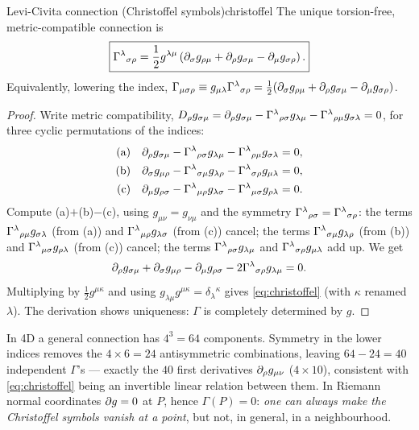 \begin{theorem}{Levi-Civita connection (Christoffel symbols)}{christoffel}
The unique torsion-free, metric-compatible connection is
\begin{equation}
  \boxed{\Gamma^{\lambda}{}_{\sigma\rho}=\frac12 g^{\lambda\mu}\left(\partial_\sigma g_{\rho\mu}+\partial_\rho g_{\sigma\mu}-\partial_\mu g_{\sigma\rho}\right).}
  \label{eq:christoffel}
\end{equation}
Equivalently, lowering the index, $\Gamma_{\mu\sigma\rho}\equiv g_{\mu\lambda}\Gamma^{\lambda}{}_{\sigma\rho}=\frac12(\partial_\sigma g_{\rho\mu}+\partial_\rho g_{\sigma\mu}-\partial_\mu g_{\sigma\rho})$.
\end{theorem}
\begin{proof}
Write metric compatibility, $D_\rho g_{\sigma\mu}=\partial_\rho g_{\sigma\mu}-\Gamma^{\lambda}{}_{\rho\sigma}g_{\lambda\mu}-\Gamma^{\lambda}{}_{\rho\mu}g_{\sigma\lambda}=0$, for three cyclic permutations of the indices:
\begin{align*}
  \text{(a)}\quad &\partial_\rho g_{\sigma\mu}-\Gamma^{\lambda}{}_{\rho\sigma}g_{\lambda\mu}-\Gamma^{\lambda}{}_{\rho\mu}g_{\sigma\lambda}=0,\\
  \text{(b)}\quad &\partial_\sigma g_{\mu\rho}-\Gamma^{\lambda}{}_{\sigma\mu}g_{\lambda\rho}-\Gamma^{\lambda}{}_{\sigma\rho}g_{\mu\lambda}=0,\\
  \text{(c)}\quad &\partial_\mu g_{\rho\sigma}-\Gamma^{\lambda}{}_{\mu\rho}g_{\lambda\sigma}-\Gamma^{\lambda}{}_{\mu\sigma}g_{\rho\lambda}=0.
\end{align*}
Compute (a)$+$(b)$-$(c), using $g_{\mu\nu}=g_{\nu\mu}$ and the symmetry $\Gamma^{\lambda}{}_{\rho\sigma}=\Gamma^{\lambda}{}_{\sigma\rho}$:
the terms $\Gamma^{\lambda}{}_{\rho\mu}g_{\sigma\lambda}$ (from (a)) and $\Gamma^{\lambda}{}_{\mu\rho}g_{\lambda\sigma}$ (from (c)) cancel; the terms $\Gamma^{\lambda}{}_{\sigma\mu}g_{\lambda\rho}$ (from (b)) and $\Gamma^{\lambda}{}_{\mu\sigma}g_{\rho\lambda}$ (from (c)) cancel; the terms $\Gamma^{\lambda}{}_{\rho\sigma}g_{\lambda\mu}$ and $\Gamma^{\lambda}{}_{\sigma\rho}g_{\mu\lambda}$ add up. We get
\[
  \partial_\rho g_{\sigma\mu}+\partial_\sigma g_{\mu\rho}-\partial_\mu g_{\rho\sigma}-2\Gamma^{\lambda}{}_{\sigma\rho}g_{\lambda\mu}=0 .
\]
Multiplying by $\frac12 g^{\mu\kappa}$ and using $g_{\lambda\mu}g^{\mu\kappa}=\delta_\lambda{}^\kappa$ gives \eqref{eq:christoffel} (with $\kappa$ renamed $\lambda$). The derivation shows uniqueness: $\Gamma$ is completely determined by $g$.
\end{proof}

\begin{remarkbox}[Counting]
In 4D a general connection has $4^3=64$ components. Symmetry in the lower indices removes the $4\times6=24$ antisymmetric combinations, leaving $64-24=40$ independent $\Gamma$'s --- exactly the $40$ first derivatives $\partial_\rho g_{\mu\nu}$ ($4\times10$), consistent with \eqref{eq:christoffel} being an invertible linear relation between them. In Riemann normal coordinates $\partial g=0$ at $P$, hence $\Gamma(P)=0$: \emph{one can always make the Christoffel symbols vanish at a point}, but not, in general, in a neighbourhood.
\end{remarkbox}

